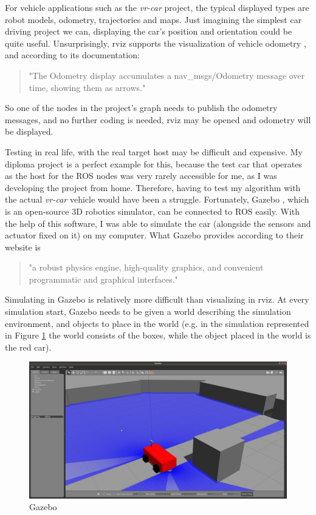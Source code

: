 For vehicle applications such as the \textit{vr-car} project, the typical displayed types are robot models, odometry, trajectories and maps. Just imagining the simplest car driving project we can, displaying the car's position and orientation could be quite useful. Unsurprisingly, rviz supports the visualization of vehicle odometry \cite{ros_rviz_Odometry}, and according to its documentation:

\begin{quote}
"The Odometry display accumulates a nav\_msgs/Odometry \cite{ros_msg_Odometry} message over time, showing them as arrows."
\end{quote}

So one of the nodes in the project's graph needs to publish the odometry messages, and no further coding is needed, rviz may be opened and odometry will be displayed.

Testing in real life, with the real target host may be difficult and expensive. My diploma project is a perfect example for this, because the test car that operates as the host for the ROS nodes was very rarely accessible for me, as I was developing the project from home. Therefore, having to test my algorithm with the actual \textit{vr-car} vehicle would have been a struggle. Fortunately, Gazebo \cite{gazebo}, which is an open-source 3D robotics simulator, can be connected to ROS easily. With the help of this software, I was able to simulate the car (alongside the sensors and actuator fixed on it) on my computer. What Gazebo provides according to their website is

\begin{quote}
"a robust physics engine, high-quality graphics, and convenient programmatic and graphical interfaces."
\end{quote}

Simulating in Gazebo is relatively more difficult than visualizing in rviz. At every simulation start, Gazebo needs to be given a world describing the simulation environment, and objects to place in the world (e.g. in the simulation represented in Figure \ref{gazebo} the world consists of the boxes, while the object placed in the world is the red car).

\begin{figure}[!ht]
	\centering
	\includegraphics[width=\textwidth]{figures/raw/jpeg/gazebo.jpg}
	\caption{Gazebo}
	\label{gazebo}
\end{figure}

